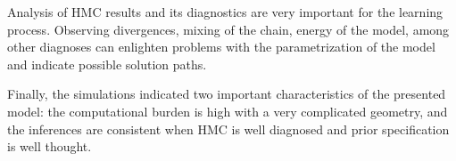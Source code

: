 Analysis of HMC results and its diagnostics are very important for the
learning process. Observing divergences, mixing of the chain, energy of the
model, among other diagnoses can enlighten problems with the parametrization
of the model and indicate possible solution paths. 

Finally, the simulations indicated two important characteristics of the
presented model: the computational burden is high with a very complicated
geometry, and the inferences are consistent when HMC is well diagnosed and
prior specification is well thought.  